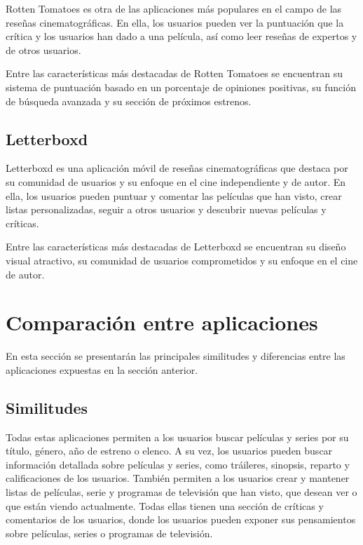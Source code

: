 Rotten Tomatoes es otra de las aplicaciones más populares en el campo de las reseñas cinematográficas. 
En ella, los usuarios pueden ver la puntuación que la crítica y los usuarios han dado a una película, 
así como leer reseñas de expertos y de otros usuarios.

Entre las características más destacadas de Rotten Tomatoes se encuentran su sistema de puntuación 
basado en un porcentaje de opiniones positivas, su función de búsqueda avanzada y su sección de 
próximos estrenos.

\subsection{Letterboxd}

Letterboxd es una aplicación móvil de reseñas cinematográficas que destaca por su comunidad de 
usuarios y su enfoque en el cine independiente y de autor. En ella, los usuarios pueden puntuar y 
comentar las películas que han visto, crear listas personalizadas, seguir a otros usuarios y descubrir 
nuevas películas y críticas.

Entre las características más destacadas de Letterboxd se encuentran su diseño visual atractivo, su 
comunidad de usuarios comprometidos y su enfoque en el cine de autor.


\section{Comparación entre aplicaciones}

En esta sección se presentarán las principales similitudes y diferencias entre las aplicaciones 
expuestas en la sección anterior.

\subsection{Similitudes}

Todas estas aplicaciones permiten a los usuarios buscar películas y series por su título, género, año 
de estreno o elenco. A su vez, los usuarios pueden buscar información detallada sobre películas y 
series, como tráileres, sinopsis, reparto y calificaciones de los usuarios. También permiten a los 
usuarios crear y mantener listas de películas, serie y programas de televisión que han visto, que 
desean ver o que están viendo actualmente. Todas ellas tienen una sección de críticas y comentarios de 
los usuarios, donde los usuarios pueden exponer sus pensamientos sobre películas, series o programas 
de televisión.


